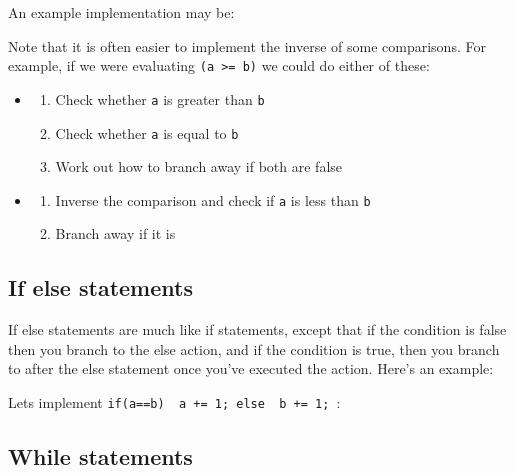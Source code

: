 An example implementation may be:


Note that it is often easier to implement the inverse of some comparisons. For
example, if we were evaluating {\tt (a >= b)} we could do either of these:

\begin{itemize}
	\item 
	\begin{enumerate}
		\item Check whether {\tt a} is greater than {\tt b}
		\item Check whether {\tt a} is equal to {\tt b}
		\item Work out how to branch away if both are false
	\end{enumerate}
	\item 
	\begin{enumerate}
		\item Inverse the comparison and check if {\tt a} is less than {\tt b}
		\item Branch away if it is
	\end{enumerate}
\end{itemize}

\subsection{If else statements}

If else statements are much like if statements, except that if the condition is
false then you branch to the else action, and if the condition is true, then you
branch to after the else statement once you've executed the action. Here's an
example:

Lets implement {\tt if(a==b) { a += 1;} else { b += 1; }}:


\subsection{While statements}

